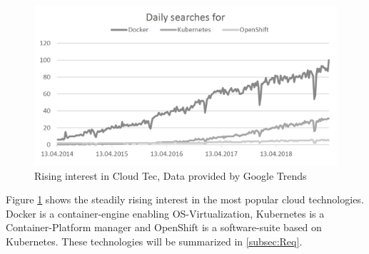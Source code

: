 \documentclass[utf8]{lni}
\begin{document}
\begin{figure}[h]
	\centering
	\includegraphics[width=0.75\linewidth]{imgs/DigDocker}
	\caption{Rising interest in Cloud Tec, Data provided by Google Trends}
	\label{fig:digdocker}	
\end{figure}

Figure \ref{fig:digdocker} shows the steadily rising interest in the most popular cloud technologies. 
Docker is a container-engine enabling OS-Virtualization, Kubernetes is a Container-Platform manager and OpenShift is a software-suite based on Kubernetes. 
These technologies will be summarized in \ref{subsec:Req}.  
\end{document}
